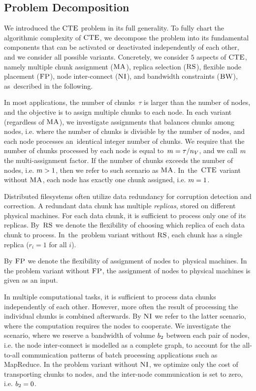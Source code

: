 \subsection{Problem Decomposition}

We introduced the $\textsc{CTE}$ problem in its full generality.
To fully chart the algorithmic complexity of $\textsc{CTE}$, we decompose the problem into its fundamental components that can be activated or deactivated independently of each other, and we consider all possible variants.
Concretely, we consider $5$ aspects of $\textsc{CTE}$, namely multiple chunk assignment ($\textsc{MA}$),
replica selection ($\textsc{RS}$), flexible node placement ($\textsc{FP}$), node inter-connect ($\textsc{NI}$),
and bandwidth constraints ($\textsc{BW}$), as~described in the following. 

In most applications, the number of chunks~$\tau$ is larger than the number of nodes, and the objective is to assign multiple chunks to each node.
In each variant (regardless of $\textsc{MA}$), we investigate assignments that balances chunks among nodes, i.e. where the number of chunks is divisible by the number of nodes, and each node processes an~identical integer number of chunks.
We require that the number of chunks processed by each node is equal to~$m = \tau / n_V$, and we call $m$ the multi-assignment factor.
If the number of chunks exceeds the number of nodes, i.e. $m > 1$, then we refer to such scenario as $\textsc{MA}$.
In~the~$\textsc{CTE}$ variant without $\textsc{MA}$, each node has exactly one chunk assigned, i.e. $m = 1$.

Distributed filesystems often utilize data redundancy for corruption detection and correction.
A redundant data chunk has multiple \emph{replicas}, stored on different physical machines.
For each data chunk, it is sufficient to process only one of its replicas.
By~$\textsc{RS}$ we denote the flexibility of choosing which replica of each data chunk to process.
In~the~problem variant without $\textsc{RS}$, each chunk has a single replica ($r_i = 1$ for all $i$).

By $\textsc{FP}$ we denote the flexibility of assignment of nodes to~physical machines.
In the problem variant without $\textsc{FP}$, the assignment of nodes to physical machines is given as an input.

In multiple computational tasks, it is sufficient to process data chunks independently of each other.
However, more often the result of processing the individual chunks is combined afterwards.
By $\textsc{NI}$ we refer to the latter scenario, where the computation requires the nodes to cooperate.
We investigate the scenario, where we reserve a bandwidth of volume $b_2$ between each pair of nodes, i.e. the node inter-connect is modelled as a complete graph, to account for the all-to-all communication patterns of batch processing applications such as MapReduce.
In the problem variant without $\textsc{NI}$, we optimize only the cost of transporting chunks to nodes, and the inter-node communication is set to zero, i.e. $b_2 = 0$.

